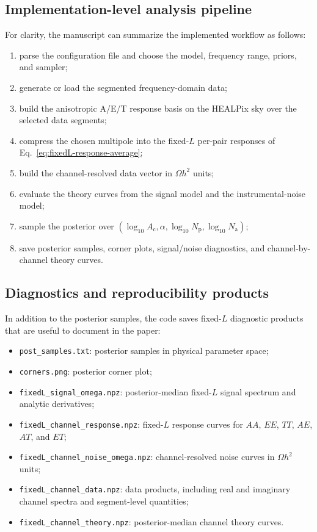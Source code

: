 \documentclass[11pt]{article}
\begin{document}
\subsection{Implementation-level analysis pipeline}

For clarity, the manuscript can summarize the implemented workflow as follows:
\begin{enumerate}[leftmargin=2.2em]
  \item parse the configuration file and choose the model, frequency range, priors, and sampler;
  \item generate or load the segmented frequency-domain data;
  \item build the anisotropic A/E/T response basis on the HEALPix sky over the selected data segments;
  \item compress the chosen multipole into the fixed-$L$ per-pair responses of Eq.~\eqref{eq:fixedL-response-average};
  \item build the channel-resolved data vector in $\Omega h^2$ units;
  \item evaluate the theory curves from the signal model and the instrumental-noise model;
  \item sample the posterior over $\left(\log_{10} A_{\mathrm{c}}, \alpha, \log_{10} N_{\mathrm{p}}, \log_{10} N_{\mathrm{a}}\right)$;
  \item save posterior samples, corner plots, signal/noise diagnostics, and channel-by-channel theory curves.
\end{enumerate}

\subsection{Diagnostics and reproducibility products}

In addition to the posterior samples, the code saves fixed-$L$ diagnostic products that are useful to document in the paper:
\begin{itemize}[leftmargin=2.2em]
  \item \texttt{post\_samples.txt}: posterior samples in physical parameter space;
  \item \texttt{corners.png}: posterior corner plot;
  \item \texttt{fixedL\_signal\_omega.npz}: posterior-median fixed-$L$ signal spectrum and analytic derivatives;
  \item \texttt{fixedL\_channel\_response.npz}: fixed-$L$ response curves for $AA$, $EE$, $TT$, $AE$, $AT$, and $ET$;
  \item \texttt{fixedL\_channel\_noise\_omega.npz}: channel-resolved noise curves in $\Omega h^2$ units;
  \item \texttt{fixedL\_channel\_data.npz}: data products, including real and imaginary channel spectra and segment-level quantities;
  \item \texttt{fixedL\_channel\_theory.npz}: posterior-median channel theory curves.
\end{itemize}
\end{document}
